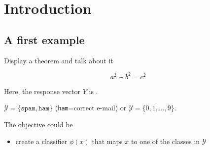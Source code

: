\documentclass[unknownkeysallowed]{beamer}
\begin{document}
\section{Introduction}
\label{sec:introdcution}

\subsection{A first example}
\label{sub:un_premier_exemple}

\begin{frame}{Display a theorem and talk about it}

\vspace{0.4cm}

{
\begin{equation*}
a^2 + b^2 = c^2
\end{equation*}
}

\vspace{0.25cm}

Here, the response vector $Y$ is .

\vspace{0.25cm}

\exple
$\mathcal{Y} = \{\texttt{spam},  \texttt{ham}\}$ (\texttt{ham}=correct e-mail) or $\mathcal{Y}= \{0, 1, \dots,9\}$.

The objective could be
\begin{itemize}
	\item create a classifier $\phi(x)$ that maps $x$ to one of the classes in $\mathcal{Y}$
\end{itemize}


\end{frame}
\end{document}
